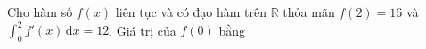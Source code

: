 \begin{ex}
Cho hàm số $f(x)$ liên tục và có đạo hàm trên $\mathbb R$ thỏa mãn $f(2)=16$ và $\displaystyle\int_0^2f'(x)\,\mathrm dx=12$. Giá trị của $f(0)$ bằng
\end{ex}
